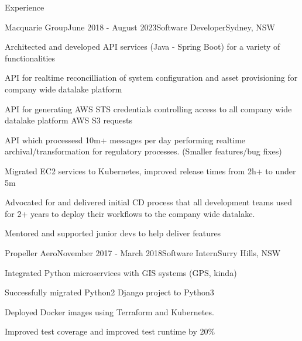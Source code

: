 \documentclass{resume} %
\begin{document}

\begin{rSection}{Experience}
    \begin{rSubsection}{Macquarie Group}{June 2018 - August 2023}{Software Developer}{Sydney, NSW}
    \item Architected and developed API services (Java - Spring Boot) for a variety of functionalities
    \item API for realtime reconcilliation of system configuration and asset provisioning for company wide datalake platform
    \item API for generating AWS STS credentials controlling access to all company wide datalake platform AWS S3 requests
    \item API which processesd 10m+ messages per day performing realtime archival/transformation for regulatory processes. (Smaller features/bug fixes)
    \item Migrated EC2 services to Kubernetes, improved release times from 2h+ to under 5m
    \item Advocated for and delivered initial CD process that all development teams used for 2+ years to deploy their workflows to the company wide datalake.
    \item Mentored and supported junior devs to help deliver features
    \end{rSubsection}

    \begin{rSubsection}{Propeller Aero}{November 2017 - March 2018}{Software Intern}{Surry Hills, NSW}
    \item Integrated Python microservices with GIS systems (GPS, kinda)
    \item Successfully migrated Python2 Django project to Python3
    \item Deployed Docker images using Terraform and Kubernetes.
    \item Improved test coverage and improved test runtime by 20\%
    \end{rSubsection}
    
    \end{rSection}

\end{document}
